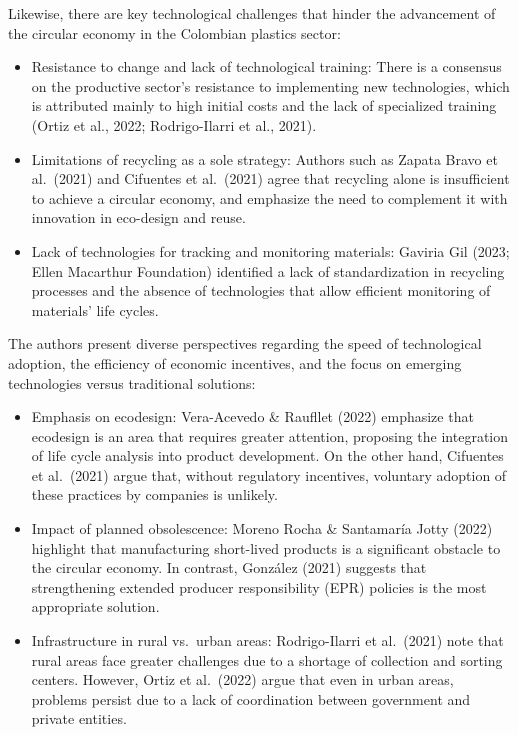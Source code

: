 \documentclass[
  12pt,
  oneside]{book}
\providecommand{\tightlist}{%
  \setlength{\itemsep}{0pt}\setlength{\parskip}{0pt}}
\begin{document}
Likewise, there are key technological challenges that hinder the
advancement of the circular economy in the Colombian plastics sector:

\begin{itemize}
\tightlist
\item
  Resistance to change and lack of technological training: There is a
  consensus on the productive sector's resistance to implementing new
  technologies, which is attributed mainly to high initial costs and the
  lack of specialized training (Ortiz et al., 2022; Rodrigo-Ilarri et
  al., 2021).
\item
  Limitations of recycling as a sole strategy: Authors such as Zapata
  Bravo et al.~(2021) and Cifuentes et al.~(2021) agree that recycling
  alone is insufficient to achieve a circular economy, and emphasize the
  need to complement it with innovation in eco-design and reuse.
\item
  Lack of technologies for tracking and monitoring materials: Gaviria
  Gil (2023; Ellen Macarthur Foundation) identified a lack of
  standardization in recycling processes and the absence of technologies
  that allow efficient monitoring of materials' life cycles.
\end{itemize}

The authors present diverse perspectives regarding the speed of
technological adoption, the efficiency of economic incentives, and the
focus on emerging technologies versus traditional solutions:

\begin{itemize}
\tightlist
\item
  Emphasis on ecodesign: Vera-Acevedo \& Raufllet (2022) emphasize that
  ecodesign is an area that requires greater attention, proposing the
  integration of life cycle analysis into product development. On the
  other hand, Cifuentes et al.~(2021) argue that, without regulatory
  incentives, voluntary adoption of these practices by companies is
  unlikely.
\item
  Impact of planned obsolescence: Moreno Rocha \& Santamaría Jotty
  (2022) highlight that manufacturing short-lived products is a
  significant obstacle to the circular economy. In contrast, González
  (2021) suggests that strengthening extended producer responsibility
  (EPR) policies is the most appropriate solution.
\item
  Infrastructure in rural vs.~urban areas: Rodrigo-Ilarri et al.~(2021)
  note that rural areas face greater challenges due to a shortage of
  collection and sorting centers. However, Ortiz et al.~(2022) argue
  that even in urban areas, problems persist due to a lack of
  coordination between government and private entities.
\end{itemize}
\end{document}
